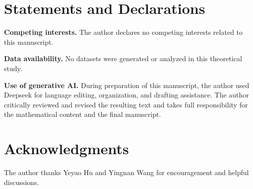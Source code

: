 \documentclass[11pt]{article}
\theoremstyle{definition}
\theoremstyle{remark}
\begin{document}
\section*{Statements and Declarations}
\noindent\textbf{Competing interests.} The author declares no competing interests related to this manuscript.

\noindent\textbf{Data availability.} No datasets were generated or analyzed in this theoretical study.

\noindent\textbf{Use of generative AI.} During preparation of this manuscript, the author used Deepseek for language editing, organization, and drafting assistance. The author critically reviewed and revised the resulting text and takes full responsibility for the mathematical content and the final manuscript.

\section*{Acknowledgments}
The author thanks Yeyao Hu and Yingnan Wang for encouragement and helpful discussions.
\end{document}
